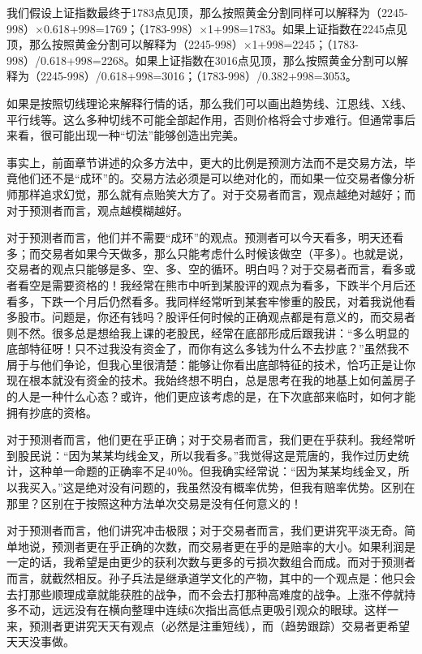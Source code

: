 我们假设上证指数最终于1783点见顶，那么按照黄金分割同样可以解释为（2245-998）×0.618+998=1769；（1783-998）×1+998=1783。如果上证指数在2245点见顶，那么按照黄金分割可以解释为（2245-998）×1+998=2245；（1783-998）/0.618+998=2268。如果上证指数在3016点见顶，那么按照黄金分割可以解释为（2245-998）/0.618+998=3016；（1783-998）/0.382+998=3053。

如果是按照切线理论来解释行情的话，那么我们可以画出趋势线、江恩线、X线、平行线等。这么多种切线不可能全部起作用，否则价格将会寸步难行。但通常事后来看，很可能出现一种“切法”能够创造出完美。

事实上，前面章节讲述的众多方法中，更大的比例是预测方法而不是交易方法，毕竟他们还不是“成环”的。交易方法必须是可以绝对化的，而如果一位交易者像分析师那样追求幻觉，那么就有点贻笑大方了。对于交易者而言，观点越绝对越好；而对于预测者而言，观点越模糊越好。

对于预测者而言，他们并不需要“成环”的观点。预测者可以今天看多，明天还看多；而交易者如果今天做多，那么只能考虑什么时候该做空（平多）。也就是说，交易者的观点只能够是多、空、多、空的循环。明白吗？对于交易者而言，看多或者看空是需要资格的！我经常在熊市中听到某股评的观点为看多，下跌半个月后还看多，下跌一个月后仍然看多。我同样经常听到某套牢惨重的股民，对着我说他看多股市。问题是，你还有钱吗？股评任何时候的正确观点都是有意义的，而交易者则不然。很多总是想给我上课的老股民，经常在底部形成后跟我讲：“多么明显的底部特征呀！只不过我没有资金了，而你有这么多钱为什么不去抄底？”虽然我不屑于与他们争论，但我心里很清楚：能够让你看出底部特征的技术，恰巧正是让你现在根本就没有资金的技术。我始终想不明白，总是思考在我的地基上如何盖房子的人是一种什么心态？或许，他们更应该考虑的是，在下次底部来临时，如何才能拥有抄底的资格。

对于预测者而言，他们更在乎正确；对于交易者而言，我们更在乎获利。我经常听到股民说：“因为某某均线金叉，所以我看多。”我觉得这是荒唐的，我作过历史统计，这种单一命题的正确率不足40％。但我确实经常说：“因为某某均线金叉，所以我买入。”这是绝对没有问题的，我虽然没有概率优势，但我有赔率优势。区别在那里？区别在于按照这种方法单次交易是没有任何意义的！

对于预测者而言，他们讲究冲击极限；对于交易者而言，我们更讲究平淡无奇。简单地说，预测者更在乎正确的次数，而交易者更在乎的是赔率的大小。如果利润是一定的话，我希望是由更少的获利次数与更多的亏损次数组合而成。而对于预测者而言，就截然相反。孙子兵法是继承道学文化的产物，其中的一个观点是：他只会去打那些顺理成章就能获胜的战争，而不会去打那种高难度的战争。上涨不停就持多不动，远远没有在横向整理中连续6次指出高低点更吸引观众的眼球。这样一来，预测者更讲究天天有观点（必然是注重短线），而（趋势跟踪）交易者更希望天天没事做。

